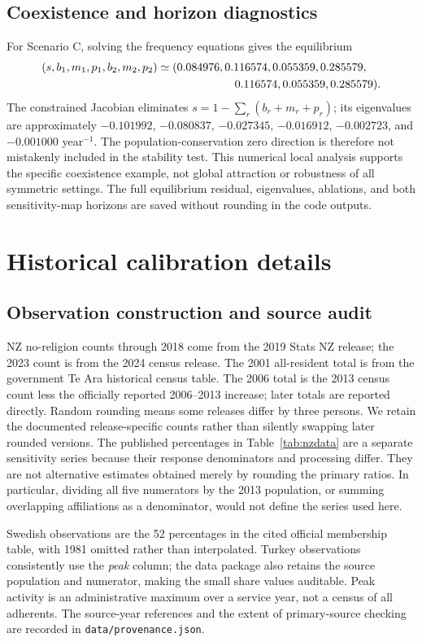 \subsection{Coexistence and horizon diagnostics}
For Scenario C, solving the frequency equations gives the equilibrium
\begin{align}
(s,b_1,m_1,p_1,b_2,m_2,p_2)
&\simeq(0.084976,0.116574,0.055359,0.285579,\nonumber\\
&\hspace{24mm}0.116574,0.055359,0.285579).
\end{align}
The constrained Jacobian eliminates $s=1-\sum_r(b_r+m_r+p_r)$; its eigenvalues are approximately
$-0.101992$, $-0.080837$, $-0.027345$, $-0.016912$, $-0.002723$, and $-0.001000$ year$^{-1}$. The population-conservation zero direction is therefore not mistakenly included in the stability test. This numerical local analysis supports the specific coexistence example, not global attraction or robustness of all symmetric settings. The full equilibrium residual, eigenvalues, ablations, and both sensitivity-map horizons are saved without rounding in the code outputs.

\section{Historical calibration details}
\label{app:fitting}
\subsection{Observation construction and source audit}

NZ no-religion counts through 2018 come from the 2019 Stats NZ release; the 2023 count is from the 2024 census release. The 2001 all-resident total is from the government Te Ara historical census table. The 2006 total is the 2013 census count less the officially reported 2006--2013 increase; later totals are reported directly. Random rounding means some releases differ by three persons. We retain the documented release-specific counts rather than silently swapping later rounded versions. The published percentages in Table~\ref{tab:nzdata} are a separate sensitivity series because their response denominators and processing differ. They are not alternative estimates obtained merely by rounding the primary ratios. In particular, dividing all five numerators by the 2013 population, or summing overlapping affiliations as a denominator, would not define the series used here.

Swedish observations are the 52 percentages in the cited official membership table, with 1981 omitted rather than interpolated. Turkey observations consistently use the \emph{peak} column; the data package also retains the source population and numerator, making the small share values auditable. Peak activity is an administrative maximum over a service year, not a census of all adherents. The source-year references and the extent of primary-source checking are recorded in \texttt{data/provenance.json}.

